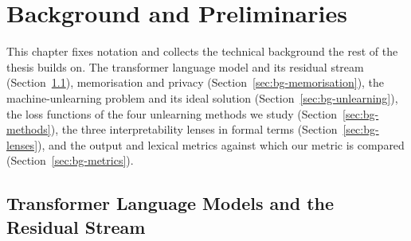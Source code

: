 \chapter{Background and Preliminaries}
\label{ch:background}

This chapter fixes notation and collects the technical background the rest of the thesis builds on. The
transformer language model and its residual stream (Section~\ref{sec:bg-transformer}), memorisation and
privacy (Section~\ref{sec:bg-memorisation}), the machine-unlearning problem and its ideal solution
(Section~\ref{sec:bg-unlearning}), the loss functions of the four unlearning methods we study
(Section~\ref{sec:bg-methods}), the three interpretability lenses in formal terms
(Section~\ref{sec:bg-lenses}), and the output and lexical metrics against which our metric is compared
(Section~\ref{sec:bg-metrics}).

\section{Transformer Language Models and the Residual Stream}
\label{sec:bg-transformer}

